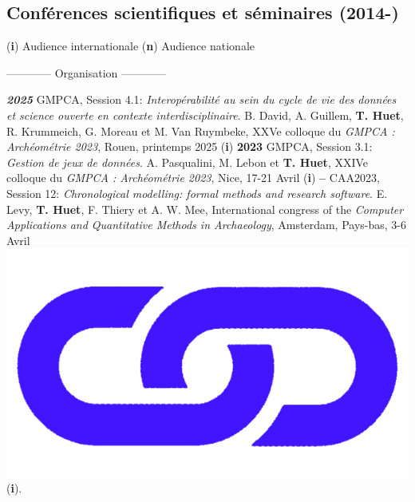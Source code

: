 \documentclass{article}
\begin{document}
\subsection*{Conférences scientifiques et séminaires (2014-)}

\begin{center}(\textbf{i}) Audience internationale {\textbar} (\textbf{n}) Audience nationale\end{center}
\smallbreak
\begin{center}------------ Organisation ------------\end{center}
\textbf{\textit{2025} }GMPCA, Session 4.1: \textit{Interopérabilité au sein du cycle de vie des données et science ouverte en contexte interdisciplinaire}. B. David, A. Guillem, \textbf{T. Huet}, R. Krummeich, G. Moreau et M. Van Ruymbeke, XXVe colloque du \textit{GMPCA : Archéométrie 2023}, Rouen, printemps 2025 (\textbf{i})
\smallbreak
\textbf{2023 }GMPCA, Session 3.1: \textit{Gestion de jeux de données}. A. Pasqualini, M. Lebon et \textbf{T. Huet}, XXIVe colloque du \textit{GMPCA : Archéométrie 2023}, Nice, 17-21 Avril (\textbf{i})
\smallbreak
\textbf{-- }CAA2023, Session 12: \textit{Chronological modelling: formal methods and research software}. E. Levy, \textbf{T. Huet}, F. Thiery et A. W. Mee, International congress of the \textit{Computer Applications and Quantitative Methods in Archaeology}, Amsterdam, Pays-bas, 3-6 Avril \href{https://historical-time.github.io/caa23/s12/pres/#/title-slide}{\includegraphics[scale=0.02]{link_darkblue.png}} (\textbf{i}).
\smallbreak
\end{document}
